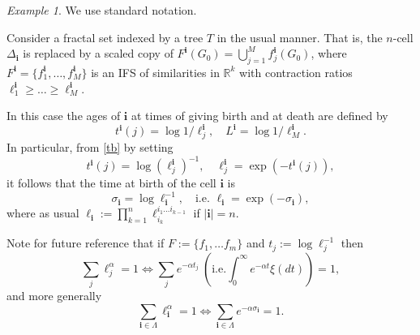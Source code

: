 \documentclass[a4paper]{amsart}
\theoremstyle{plain}
\theoremstyle{definition}
\theoremstyle{remark}
\newtheorem{example}[theorem]{Example}
\begin{document}
\begin{example}
We use standard notation.

Consider a fractal set indexed by a tree $ T $ in the usual manner.  That is, the  $ n $-cell $\Delta_{\boldsymbol{i}}$ is replaced by  a scaled copy of $ F^{ \boldsymbol{i} }(G_0) =  \bigcup_{j=1}^M f^{ \boldsymbol{i} }_j(G_0) $, where $ F^{ \boldsymbol{i} } = \{f^{ \boldsymbol{i} }_1,\dots, f^{ \boldsymbol{i} }_M\} $ is an IFS of similarities in $ \mathbb{R}^k $ with contraction ratios $ \ell^{ \boldsymbol{i} }_1\geq \dots \geq  \ell^{ \boldsymbol{i} }_M $. 

In this case the ages of $ \boldsymbol{i} $ at   times of giving birth and at death  are  defined by
\[
 t^{ \boldsymbol{i} } (j) = \log 1/\ell^{ \boldsymbol{i} } _j, \quad L^{ \boldsymbol{i} } = \log 1/ \ell^{ \boldsymbol{i} } _M .
\]
 In particular,  from \eqref{tb} by setting
\[
t^{ \boldsymbol{i} }(j) = \log \left(\ell^{ \boldsymbol{i} }_j \right)^{-1}, \quad \ell^{ \boldsymbol{i} }_j  = \exp \left( - t^{ \boldsymbol{i} }(j)  \right),
\]
it follows that 
  the time at birth of the cell $ \boldsymbol{i} $ is 
\begin{equation} \label{}
\sigma_{\boldsymbol{i}  } = \log \ell_{ \boldsymbol{i} }^{-1}, \quad \text{i.e.\ }  \ell_{ \boldsymbol{i} } = \exp \left( - \sigma_{\boldsymbol{i}  } \right),
\end{equation}
where as usual $ 
\ell_{ \boldsymbol{i} } := \prod_{k=1}^n \ell^{ i_1\dots i_{k-1}}_{i_k} $ 
if $ | \boldsymbol{i} | = n $. 

Note for future reference that  if $ F:= \{ f_1,\dots f_m \} $ and $ t_j := \log \ell_j^{-1} $ then  
\begin{equation} \label{}
\sum_j \ell^ \alpha _j = 1 \Longleftrightarrow  \sum_j e^{- \alpha t_j  } \ \left(\text{i.e.} \int_0^\infty e^{- \alpha t} \xi (dt) \right) 
= 1 ,
\end{equation}
and more generally
\begin{equation} \label{}
\sum_{\boldsymbol{i} \in \Lambda } \ell_{ \boldsymbol{i} }^ \alpha  = 1 \Longleftrightarrow 
                \sum_{\boldsymbol{i} \in \Lambda } e^{ - \alpha \sigma _{ \boldsymbol{i} }} = 1.
\end{equation} 



\end{example} 

\end{document}

